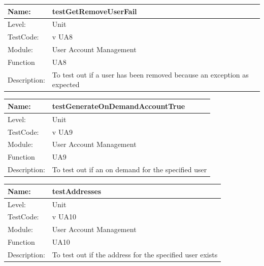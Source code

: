 \documentclass[12pt]{article}
\begin{document}
\begin{center}
\begin{tabular}{|l|p{12cm}|}
\hline

 Name: & testGetRemoveUserFail \\
\hline
Level: & Unit \\
\hline
TestCode: & v UA8 \\
\hline
Module:& User Account Management\\
\hline
Function & UA8 \\
\hline
Description: & To test out if a user has been removed because an exception as expected \\
\hline

\end{tabular}
\end{center}

\begin{center}
\begin{tabular}{|l|p{12cm}|}
\hline

 Name: & testGenerateOnDemandAccountTrue\\
\hline
Level: & Unit \\
\hline
TestCode: & v UA9 \\
\hline
Module:& User Account Management\\
\hline
Function & UA9 \\
\hline
Description: & To test out if an on demand for the specified user \\
\hline

\end{tabular}
\end{center}

\begin{center}
\begin{tabular}{|l|p{12cm}|}
\hline

 Name: & testAddresses\\
\hline
Level: & Unit \\
\hline
TestCode: & v UA10 \\
\hline
Module:& User Account Management\\
\hline
Function & UA10 \\
\hline
Description: & To test out if the address for the specified user exists \\
\hline

\end{tabular}
\end{center}
\end{document}
